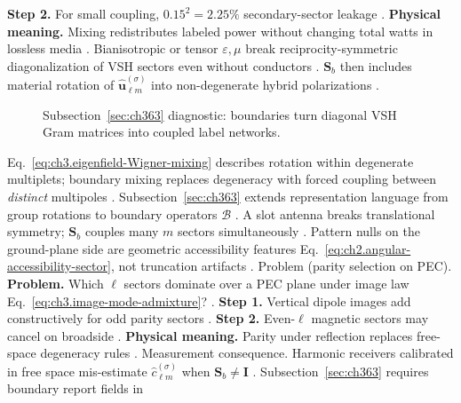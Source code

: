 \textbf{Step 2.} For small coupling, \(0.15^{2}=2.25\%\) secondary-sector leakage \cite{harrington2001}.
\textbf{Physical meaning.} Mixing redistributes labeled power without changing total watts in lossless media
\cite{stratton1941}.
Bianisotropic or tensor \(\varepsilon,\mu\) break reciprocity-symmetric diagonalization of VSH sectors even without
conductors \cite{stratton1941}. \(\mathbf{S}_{b}\) then includes material rotation of
\(\widehat{\mathbf{u}}_{\ell m}^{(\sigma)}\) into non-degenerate hybrid polarizations \cite{hansen1988}.
\begin{figure}[t]
\centering
{}
\caption{Subsection~\ref{sec:ch363} diagnostic: boundaries turn diagonal VSH Gram matrices into coupled label networks.}
\label{fig:ch3.363-gram-offdiagonal}
\end{figure}
Eq.~\eqref{eq:ch3.eigenfield-Wigner-mixing} describes rotation within degenerate multiplets; boundary mixing replaces
degeneracy with forced coupling between \emph{distinct} multipoles \cite{jackson1999}. Subsection~\ref{sec:ch363}
extends representation language from group rotations to boundary operators \(\mathcal{B}\) \cite{stratton1941}.
A slot antenna breaks translational symmetry; \(\mathbf{S}_{b}\) couples many \(m\) sectors simultaneously
\cite{harrington2001}. Pattern nulls on the ground-plane side are geometric accessibility features
Eq.~\eqref{eq:ch2.angular-accessibility-sector}, not truncation artifacts \cite{stratton1941}.
Problem (parity selection on PEC). \textbf{Problem.} Which \(\ell\) sectors dominate over a PEC plane under image law Eq.~\eqref{eq:ch3.image-mode-admixture}?
\cite{jackson1999}.
\textbf{Step 1.} Vertical dipole images add constructively for odd parity sectors \cite{jackson1999}.
\textbf{Step 2.} Even-\(\ell\) magnetic sectors may cancel on broadside \cite{stratton1941}.
\textbf{Physical meaning.} Parity under reflection replaces free-space degeneracy rules \cite{harrington2001}.
Measurement consequence. Harmonic receivers calibrated in free space mis-estimate \(\widehat{c}_{\ell m}^{(\sigma)}\) when \(\mathbf{S}_{b}\neq\mathbf{I}\)
\cite{harrington2001}. Subsection~\ref{sec:ch363} requires boundary report fields in

